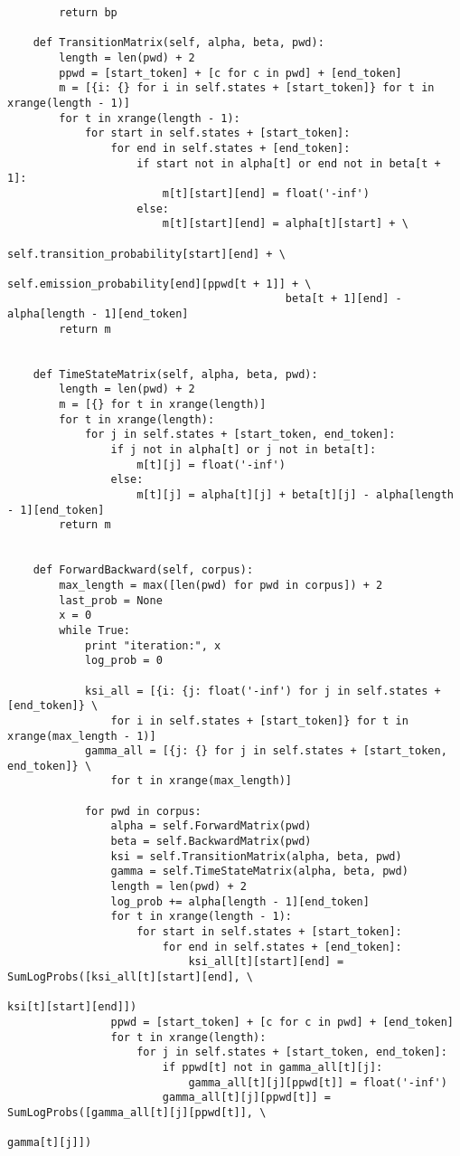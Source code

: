 \documentclass{amsart}
\theoremstyle{definition}
\theoremstyle{remark}
\numberwithin{equation}{section}
\begin{document}
\begin{lstlisting}
        return bp

    def TransitionMatrix(self, alpha, beta, pwd):
        length = len(pwd) + 2
        ppwd = [start_token] + [c for c in pwd] + [end_token]
        m = [{i: {} for i in self.states + [start_token]} for t in xrange(length - 1)]
        for t in xrange(length - 1):
            for start in self.states + [start_token]:
                for end in self.states + [end_token]:
                    if start not in alpha[t] or end not in beta[t + 1]:
                        m[t][start][end] = float('-inf')
                    else:
                        m[t][start][end] = alpha[t][start] + \
                                           self.transition_probability[start][end] + \
                                           self.emission_probability[end][ppwd[t + 1]] + \
                                           beta[t + 1][end] - alpha[length - 1][end_token]
        return m


    def TimeStateMatrix(self, alpha, beta, pwd):
        length = len(pwd) + 2
        m = [{} for t in xrange(length)]
        for t in xrange(length):
            for j in self.states + [start_token, end_token]:
                if j not in alpha[t] or j not in beta[t]:
                    m[t][j] = float('-inf')
                else:
                    m[t][j] = alpha[t][j] + beta[t][j] - alpha[length - 1][end_token]
        return m


    def ForwardBackward(self, corpus):
        max_length = max([len(pwd) for pwd in corpus]) + 2
        last_prob = None
        x = 0
        while True:
            print "iteration:", x
            log_prob = 0

            ksi_all = [{i: {j: float('-inf') for j in self.states + [end_token]} \
                for i in self.states + [start_token]} for t in xrange(max_length - 1)]
            gamma_all = [{j: {} for j in self.states + [start_token, end_token]} \
                for t in xrange(max_length)]

            for pwd in corpus:
                alpha = self.ForwardMatrix(pwd)
                beta = self.BackwardMatrix(pwd)
                ksi = self.TransitionMatrix(alpha, beta, pwd)
                gamma = self.TimeStateMatrix(alpha, beta, pwd)
                length = len(pwd) + 2
                log_prob += alpha[length - 1][end_token]
                for t in xrange(length - 1):
                    for start in self.states + [start_token]:
                        for end in self.states + [end_token]:
                            ksi_all[t][start][end] = SumLogProbs([ksi_all[t][start][end], \
                                                                  ksi[t][start][end]])
                ppwd = [start_token] + [c for c in pwd] + [end_token]
                for t in xrange(length):
                    for j in self.states + [start_token, end_token]:
                        if ppwd[t] not in gamma_all[t][j]:
                            gamma_all[t][j][ppwd[t]] = float('-inf')
                        gamma_all[t][j][ppwd[t]] = SumLogProbs([gamma_all[t][j][ppwd[t]], \
                                                                gamma[t][j]])


\end{lstlisting}
\end{document}
